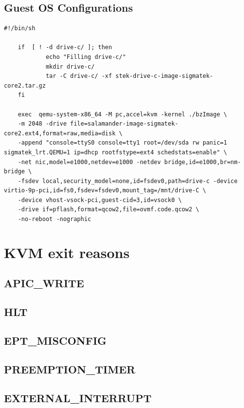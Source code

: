\documentclass[MMR,Master,english]{twbook}
\begin{document}
\section{Guest OS Configurations}
\vspace{1em}
\begin{minipage}{\linewidth}
	\begin{lstlisting}[name={QEMU script for starting Salamander 4 virtualisation},label={script:qemu_configuration_optimizations}]
    #!/bin/sh

    if  [ ! -d drive-c/ ]; then
            echo "Filling drive-c/"
            mkdir drive-c/
            tar -C drive-c/ -xf stek-drive-c-image-sigmatek-core2.tar.gz
    fi
    
    exec  qemu-system-x86_64 -M pc,accel=kvm -kernel ./bzImage \
    -m 2048 -drive file=salamander-image-sigmatek-core2.ext4,format=raw,media=disk \
    -append "console=ttyS0 console=tty1 root=/dev/sda rw panic=1 sigmatek_lrt.QEMU=1 ip=dhcp rootfstype=ext4 schedstats=enable" \
    -net nic,model=e1000,netdev=e1000 -netdev bridge,id=e1000,br=nm-bridge \
    -fsdev local,security_model=none,id=fsdev0,path=drive-c -device virtio-9p-pci,id=fs0,fsdev=fsdev0,mount_tag=/mnt/drive-C \
    -device vhost-vsock-pci,guest-cid=3,id=vsock0 \
    -drive if=pflash,format=qcow2,file=ovmf.code.qcow2 \
    -no-reboot -nographic
\end{lstlisting}
\end{minipage}
\clearpage

\chapter{KVM exit reasons}\label{cha:kvm_exit_reasons}

\section{APIC\_WRITE}
\section{HLT}
\section{EPT\_MISCONFIG}
\section{PREEMPTION\_TIMER}
\section{EXTERNAL\_INTERRUPT}
\end{document}
